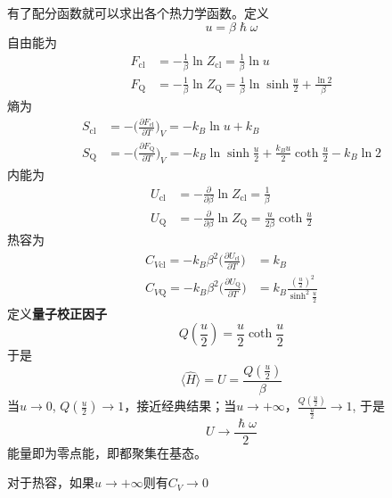     有了配分函数就可以求出各个热力学函数。定义
    \[ u = \beta\hslash\omega \]
    自由能为
    \begin{equation}\begin{aligned}
        F_\mathrm{cl} &= -\frac 1{\beta} \ln{Z_\mathrm{cl}} = \frac 1{\beta} \ln{u}\\
        F_\mathrm{Q} &= -\frac 1{\beta} \ln{Z_\mathrm{Q}} = \frac 1{\beta}\ln{\sinh{\frac u2}}+ \frac {\ln{2}}{\beta}
    \end{aligned}\end{equation}
    熵为
    \begin{equation}\begin{aligned}
        S_\mathrm{cl} &= -\bigg(\frac {\partial F_{\mathrm{cl}}}{\partial T}\bigg)_V = -k_B \ln{u} + k_B\\
        S_\mathrm{Q} &= -\bigg(\frac {\partial F_{\mathrm{Q}}}{\partial T}\bigg)_V = -k_B \ln{\sinh{\frac u2}} + \frac {k_Bu}2 \coth{\frac u2} - k_B \ln{2}
    \end{aligned}\end{equation}
    内能为
    \begin{equation}\begin{aligned}
        U_\mathrm{cl} &= -\frac {\partial}{\partial \beta}\ln{Z_\mathrm{cl}} = \frac 1{\beta}\\
        U_\mathrm{Q} &= -\frac {\partial}{\partial \beta}\ln{Z_\mathrm{Q}} = \frac {u}{2\beta} \coth{\frac u2}
    \end{aligned}\end{equation}
    热容为
    \begin{equation}\begin{aligned}
        C_{V\mathrm{cl}} = -k_B \beta^2 \bigg(\frac {\partial U_\mathrm{cl}}{\partial T}) &= k_B\\
        C_{V\mathrm{Q}} = -k_B \beta^2 \bigg(\frac {\partial U_\mathrm{Q}}{\partial T}) &= k_B \frac {(\frac u2)^2}{\sinh^2{\frac u2}}
    \end{aligned}\end{equation}
    定义\textbf{量子校正因子}
    \[ Q(\frac u2) = \frac u2 \coth{\frac u2} \]
    于是 
    \[ \langle \hat{H} \rangle = U = \frac {Q(\frac u2)}{\beta} \]
    当$u \to 0$, $Q(\frac u2) \to 1$，接近经典结果；当$u \to +\infty$，$\frac {Q(\frac u2)}{\frac u2} \to 1$, 于是
    \[U \to \frac {\hslash \omega}2 \]
    能量即为零点能，即都聚集在基态。

    对于热容，如果$u \to +\infty$则有$C_V \to 0$

    
    

